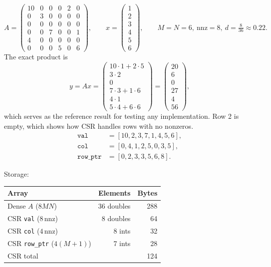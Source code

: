 \documentclass[11pt,a4paper]{article}
\newcommand{\id}[1]{\texttt{#1}}
\newcommand{\nnz}{\mathrm{nnz}}
\begin{document}
\[
A = \begin{pmatrix}
10 & 0 & 0 & 0 & 2 & 0 \\
0  & 3 & 0 & 0 & 0 & 0 \\
0  & 0 & 0 & 0 & 0 & 0 \\
0  & 0 & 7 & 0 & 0 & 1 \\
4  & 0 & 0 & 0 & 0 & 0 \\
0  & 0 & 0 & 5 & 0 & 6
\end{pmatrix},
\qquad
x = \begin{pmatrix} 1 \\ 2 \\ 3 \\ 4 \\ 5 \\ 6 \end{pmatrix},
\qquad M = N = 6,\ \nnz = 8,\ d = \tfrac{8}{36} \approx 0.22 .
\]
The exact product is
\[
y = Ax =
\begin{pmatrix}
10 \cdot 1 + 2 \cdot 5 \\
3 \cdot 2 \\
0 \\
7 \cdot 3 + 1 \cdot 6 \\
4 \cdot 1 \\
5 \cdot 4 + 6 \cdot 6
\end{pmatrix}
=
\begin{pmatrix} 20 \\ 6 \\ 0 \\ 27 \\ 4 \\ 56 \end{pmatrix},
\]
which serves as the reference result for testing any implementation.
Row 2 is empty, which shows how CSR handles rows with no nonzeros.
\begin{align*}
\id{val}     &= [10, 2, 3, 7, 1, 4, 5, 6], \\
\id{col}     &= [0, 4, 1, 2, 5, 0, 3, 5], \\
\id{row\_ptr} &= [0, 2, 3, 3, 5, 6, 8].
\end{align*}

\noindent Storage:
\begin{center}
\begin{tabular}{lrr}
\toprule
Array & Elements & Bytes \\
\midrule
Dense $A$ ($8MN$) & $36$ doubles & 288 \\
\midrule
CSR \id{val} ($8\,\nnz$) & 8 doubles & 64 \\
CSR \id{col} ($4\,\nnz$) & 8 ints & 32 \\
CSR \id{row\_ptr} ($4(M+1)$) & 7 ints & 28 \\
CSR total & & 124 \\
\bottomrule
\end{tabular}
\end{center}
\end{document}
